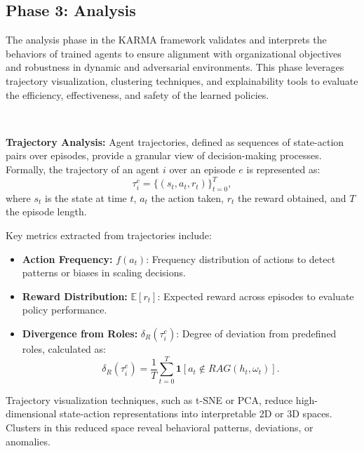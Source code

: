 \documentclass[conference]{IEEEtran}
\begin{document}
\subsection{Phase 3: Analysis}

The analysis phase in the KARMA framework validates and interprets the behaviors of trained agents to ensure alignment with organizational objectives and robustness in dynamic and adversarial environments. This phase leverages trajectory visualization, clustering techniques, and explainability tools to evaluate the efficiency, effectiveness, and safety of the learned policies.

\

\noindent\textbf{Trajectory Analysis:} 
Agent trajectories, defined as sequences of state-action pairs over episodes, provide a granular view of decision-making processes. Formally, the trajectory of an agent $i$ over an episode $e$ is represented as:
\[
\tau_i^e = \{(s_t, a_t, r_t)\}_{t=0}^{T},
\]
where $s_t$ is the state at time $t$, $a_t$ the action taken, $r_t$ the reward obtained, and $T$ the episode length.

Key metrics extracted from trajectories include:
\begin{itemize}
    \item \textbf{Action Frequency:} $f(a_t)$: Frequency distribution of actions to detect patterns or biases in scaling decisions.
    \item \textbf{Reward Distribution:} $\mathbb{E}[r_t]$: Expected reward across episodes to evaluate policy performance.
    \item \textbf{Divergence from Roles:} $\delta_R(\tau_i^e)$: Degree of deviation from predefined roles, calculated as:
    \[
    \delta_R(\tau_i^e) = \frac{1}{T} \sum_{t=0}^T \mathbf{1}[a_t \notin RAG(h_t, \omega_t)].
    \]
\end{itemize}

Trajectory visualization techniques, such as t-SNE or PCA, reduce high-dimensional state-action representations into interpretable 2D or 3D spaces. Clusters in this reduced space reveal behavioral patterns, deviations, or anomalies.

\
\end{document}
